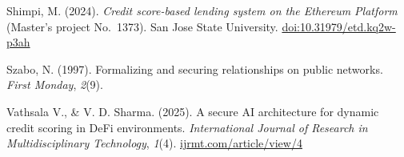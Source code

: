 \hangindent=0.5in  Shimpi, M. (2024). \textit{Credit score-based lending system on the Ethereum Platform} (Master's project No.\ 1373). San Jose State University. \href{https://doi.org/10.31979/etd.kq2w-p3ah}{doi:10.31979/etd.kq2w-p3ah}\par

\hangindent=0.5in  Szabo, N. (1997). Formalizing and securing relationships on public networks. \textit{First Monday}, \textit{2}(9).\par

\hangindent=0.5in  Vathsala V., \& V. D. Sharma. (2025). A secure AI architecture for dynamic credit scoring in DeFi environments. \textit{International Journal of Research in Multidisciplinary Technology}, \textit{1}(4). \href{https://ijrmt.com/index.php/ijrmt/article/view/4}{ijrmt.com/article/view/4}\par
